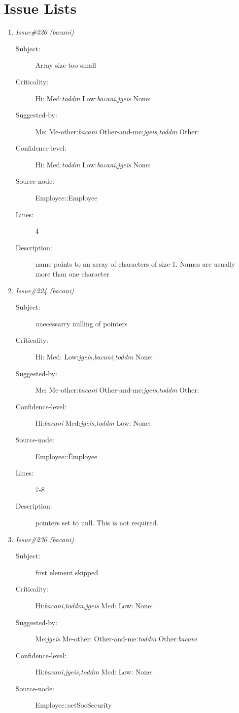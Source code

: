 \section{Issue Lists}
\begin{enumerate}
\item {\it Issue\#220 (bacani)}
\begin{description}
\item [Subject:] Array size too small
\item [Criticality:] Hi:{\it } Med:{\it toddm} Low:{\it bacani,jgeis} None:{\it }
\item [Suggested-by:] Me:{\it } Me-other:{\it bacani} Other-and-me:{\it jgeis,toddm} Other:{\it }
\item [Confidence-level:] Hi:{\it } Med:{\it toddm} Low:{\it bacani,jgeis} None:{\it }
\item [Source-node:] Employee::Employee

\item [Lines:] 4

\item [Description:] name points to an array of characters of size
1.  Names are usually more than one character
\end{description}
\item {\it Issue\#224 (bacani)}
\begin{description}
\item [Subject:] unecessarry nulling of pointers
\item [Criticality:] Hi:{\it } Med:{\it } Low:{\it jgeis,bacani,toddm} None:{\it }
\item [Suggested-by:] Me:{\it } Me-other:{\it bacani} Other-and-me:{\it jgeis,toddm} Other:{\it }
\item [Confidence-level:] Hi:{\it bacani} Med:{\it jgeis,toddm} Low:{\it } None:{\it }
\item [Source-node:] Employee::\~Employee

\item [Lines:] 7-8

\item [Description:] pointers set to null.  This is not required.
\end{description}
\item {\it Issue\#230 (bacani)}
\begin{description}
\item [Subject:] first element skipped
\item [Criticality:] Hi:{\it bacani,toddm,jgeis} Med:{\it } Low:{\it } None:{\it }
\item [Suggested-by:] Me:{\it jgeis} Me-other:{\it } Other-and-me:{\it toddm} Other:{\it bacani}
\item [Confidence-level:] Hi:{\it bacani,jgeis,toddm} Med:{\it } Low:{\it } None:{\it }
\item [Source-node:] Employee::setSocSecurity


\end{description}
\end{enumerate}
